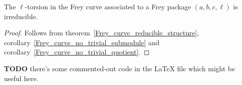 \begin{theorem}\label{Frey_curve_irreducible} The $\ell$-torsion in the Frey curve associated to a Frey package $(a,b,c,\ell)$ is irreducible.
\end{theorem}
\begin{proof} Follows from theorem~\ref{Frey_curve_reducible_structure}, corollary~\ref{Frey_curve_no_trivial_submodule}
  and corollary~\ref{Frey_curve_no_trivial_quotient}.
\end{proof}

{\bf TODO} there's some commented-out code in the LaTeX file which might be useful here.

%
%
%

